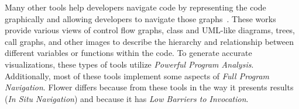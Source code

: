 \documentclass[conference]{IEEEtran}
\begin{document}
Many other tools help developers navigate code by representing the code graphically and allowing developers to navigate those graphs~\cite{CodeBubbles,CodeCanvas,CodeSurfer,Dora,Reacher,Relo,Whyline}. 
These works provide various views of control flow graphs, class and UML-like diagrams, trees, call graphs, and other images to describe the hierarchy and relationship between different variables or functions within the code. 
To generate accurate visualizations, these types of tools utilize \textit{Powerful Program Analysis}.
Additionally, most of these tools implement some aspects of \textit{Full Program Navigation}.
Flower differs because from these tools in the way it presents results (\textit{In Situ Navigation}) and because it has \textit{Low Barriers to Invocation}.

%
\end{document}
